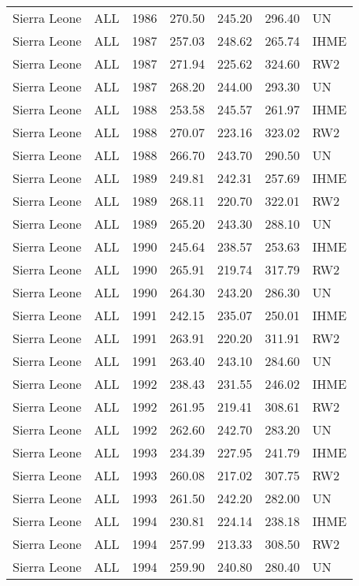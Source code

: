 \begin{longtable}{lllrrrl}
  Sierra Leone & ALL & 1986 & 270.50 & 245.20 & 296.40 & UN \\ 
  Sierra Leone & ALL & 1987 & 257.03 & 248.62 & 265.74 & IHME \\ 
  Sierra Leone & ALL & 1987 & 271.94 & 225.62 & 324.60 & RW2 \\ 
  Sierra Leone & ALL & 1987 & 268.20 & 244.00 & 293.30 & UN \\ 
  Sierra Leone & ALL & 1988 & 253.58 & 245.57 & 261.97 & IHME \\ 
  Sierra Leone & ALL & 1988 & 270.07 & 223.16 & 323.02 & RW2 \\ 
  Sierra Leone & ALL & 1988 & 266.70 & 243.70 & 290.50 & UN \\ 
  Sierra Leone & ALL & 1989 & 249.81 & 242.31 & 257.69 & IHME \\ 
  Sierra Leone & ALL & 1989 & 268.11 & 220.70 & 322.01 & RW2 \\ 
  Sierra Leone & ALL & 1989 & 265.20 & 243.30 & 288.10 & UN \\ 
  Sierra Leone & ALL & 1990 & 245.64 & 238.57 & 253.63 & IHME \\ 
  Sierra Leone & ALL & 1990 & 265.91 & 219.74 & 317.79 & RW2 \\ 
  Sierra Leone & ALL & 1990 & 264.30 & 243.20 & 286.30 & UN \\ 
  Sierra Leone & ALL & 1991 & 242.15 & 235.07 & 250.01 & IHME \\ 
  Sierra Leone & ALL & 1991 & 263.91 & 220.20 & 311.91 & RW2 \\ 
  Sierra Leone & ALL & 1991 & 263.40 & 243.10 & 284.60 & UN \\ 
  Sierra Leone & ALL & 1992 & 238.43 & 231.55 & 246.02 & IHME \\ 
  Sierra Leone & ALL & 1992 & 261.95 & 219.41 & 308.61 & RW2 \\ 
  Sierra Leone & ALL & 1992 & 262.60 & 242.70 & 283.20 & UN \\ 
  Sierra Leone & ALL & 1993 & 234.39 & 227.95 & 241.79 & IHME \\ 
  Sierra Leone & ALL & 1993 & 260.08 & 217.02 & 307.75 & RW2 \\ 
  Sierra Leone & ALL & 1993 & 261.50 & 242.20 & 282.00 & UN \\ 
  Sierra Leone & ALL & 1994 & 230.81 & 224.14 & 238.18 & IHME \\ 
  Sierra Leone & ALL & 1994 & 257.99 & 213.33 & 308.50 & RW2 \\ 
  Sierra Leone & ALL & 1994 & 259.90 & 240.80 & 280.40 & UN \\ 

\end{longtable}
